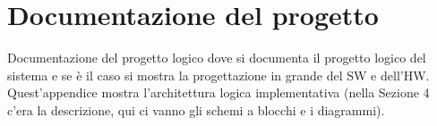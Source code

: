 \chapter{Documentazione del progetto}
\label{appendiceA}
\thispagestyle{empty}

\noindent Documentazione del progetto logico dove si documenta il progetto logico del sistema e se \`e il caso si mostra la progettazione in grande del SW e dell'HW. Quest'appendice mostra l'architettura logica implementativa (nella Sezione 4 c'era la descrizione, qui ci vanno gli schemi a blocchi e i diagrammi).